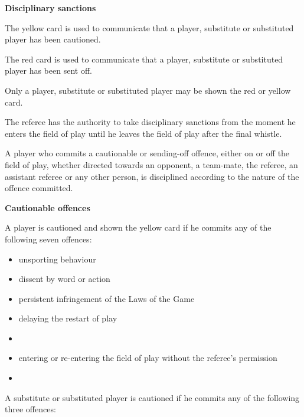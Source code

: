{\bigskip

{\bfseries Disciplinary sanctions}

\headlinebox

The yellow card is used to communicate that a player, substitute or substituted player has been cautioned.

\bigskip

The red card is used to communicate that a player, substitute or substituted player has been sent off.

\bigskip

Only a player, substitute or substituted player may be shown the red or yellow card.

\bigskip

The referee has the authority to take disciplinary sanctions from the moment he enters the field of play until he leaves the field of play after the final whistle. 

\bigskip

A player who commits a cautionable or sending-off offence, either on or off the field of play, whether directed towards an opponent, a team-mate, the referee, an assistant referee or any other person, is disciplined according to the nature of the offence committed.

\bigskip

{\bfseries Cautionable offences }

\headlinebox

A player is cautioned and shown the yellow card if he commits any of the following seven offences: 

\begin{itemize}
\item unsporting behaviour
\item dissent by word or action
\item persistent infringement of the Laws of the Game
\item delaying the restart of play
\item {}
\item entering or re-entering the field of play without the referee's permission
\item {}
\end{itemize}

\bigskip

A substitute or substituted player is cautioned if he commits any of the following three offences: 

}
